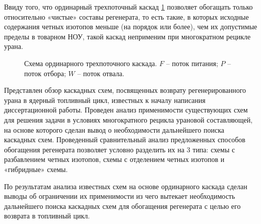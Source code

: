 Ввиду того, что ординарный трехпоточный каскад \ref{ordinary} позво­ляет обогащать только относительно «чистые» составы регенерата, то есть такие, в которых исходные содержания четных изотопов меньше (на порядок или более), чем их допустимые пределы в товарном НОУ, такой каскад неприменим при многократном рецикле урана.

\begin{figure}[ht]
  \caption{Схема ординарного трехпоточного каскада. $F$ -- поток питания; $P$ -- поток отбора; $W$ -- поток отвала.}\label{ordinary}
\end{figure}

Представлен обзор каскадных схем, посвященных возврату регенерированного урана в ядерный топливный цикл, известных к началу написания диссертационной работы. Проведен анализ применимости существующих схем для решения задачи в условиях многократного рецикла урановой составляющей, на основе которого сделан вывод о необходимости дальнейшего поиска каскадных схем.
Проведенный сравнительный анализ предложенных способов обогащения регенерата позволяет условно разделить их на 3 типа: схемы с разбавлением четных изотопов, схемы с отделением четных изотопов и «гибридные» схемы.

По результатам анализа известных схем на основе ординарного каскада сделан выводы об ограничении их применимости из чего вытекает необходимость дальнейшего поиска каскадных схем для обогащения регенерата с целью его возврата в топливный цикл.

